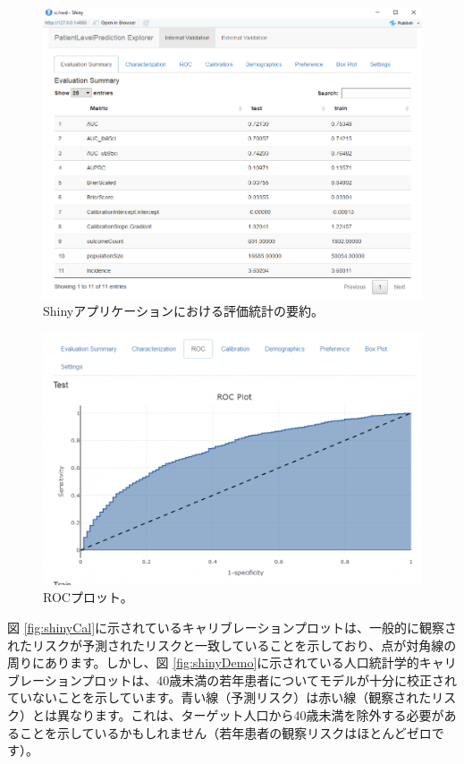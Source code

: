 \documentclass[
  11pt]{book}
\theoremstyle{definition}
\theoremstyle{definition}
\theoremstyle{definition}
\theoremstyle{definition}
\theoremstyle{remark}
\begin{document}
\begin{figure}
\includegraphics[width=1\linewidth]{images/PatientLevelPrediction/shinysummary} \caption{Shinyアプリケーションにおける評価統計の要約。}\label{fig:shinySummary}
\end{figure}

\begin{figure}

{\centering \includegraphics[width=1\linewidth]{images/PatientLevelPrediction/shiny/singleShiny/singleShinyRoc} 

}

\caption{ROCプロット。}\label{fig:shinyROC}
\end{figure}

図 \ref{fig:shinyCal}に示されているキャリブレーションプロットは、一般的に観察されたリスクが予測されたリスクと一致していることを示しており、点が対角線の周りにあります。しかし、図 \ref{fig:shinyDemo}に示されている人口統計学的キャリブレーションプロットは、40歳未満の若年患者についてモデルが十分に校正されていないことを示しています。青い線（予測リスク）は赤い線（観察されたリスク）とは異なります。これは、ターゲット人口から40歳未満を除外する必要があることを示しているかもしれません（若年患者の観察リスクはほとんどゼロです）。
\end{document}
